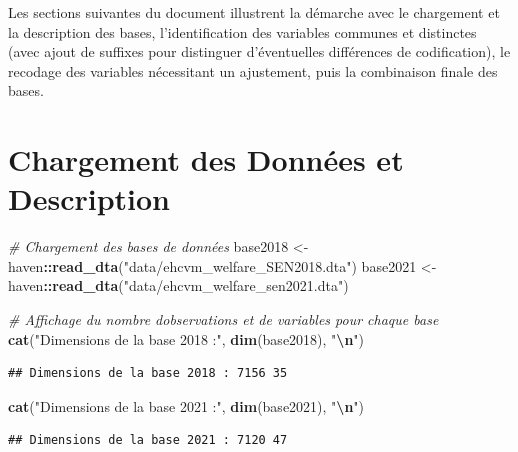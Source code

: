 \documentclass[
]{article}
\newenvironment{Shaded}{\begin{snugshade}}{\end{snugshade}}
\newcommand{\CommentTok}[1]{\textcolor[rgb]{0.56,0.35,0.01}{\textit{#1}}}
\newcommand{\FunctionTok}[1]{\textcolor[rgb]{0.13,0.29,0.53}{\textbf{#1}}}
\newcommand{\NormalTok}[1]{#1}
\newcommand{\OtherTok}[1]{\textcolor[rgb]{0.56,0.35,0.01}{#1}}
\newcommand{\SpecialCharTok}[1]{\textcolor[rgb]{0.81,0.36,0.00}{\textbf{#1}}}
\newcommand{\StringTok}[1]{\textcolor[rgb]{0.31,0.60,0.02}{#1}}
\begin{document}
Les sections suivantes du document illustrent la démarche avec le
chargement et la description des bases, l'identification des variables
communes et distinctes (avec ajout de suffixes pour distinguer
d'éventuelles différences de codification), le recodage des variables
nécessitant un ajustement, puis la combinaison finale des bases.

\hypertarget{chargement-des-donnuxe9es-et-description}{%
\section{Chargement des Données et
Description}\label{chargement-des-donnuxe9es-et-description}}

\begin{Shaded}
\begin{Highlighting}[]
\CommentTok{\# Chargement des bases de données}
\NormalTok{base2018 }\OtherTok{\textless{}{-}}\NormalTok{ haven}\SpecialCharTok{::}\FunctionTok{read\_dta}\NormalTok{(}\StringTok{"data/ehcvm\_welfare\_SEN2018.dta"}\NormalTok{)}
\NormalTok{base2021 }\OtherTok{\textless{}{-}}\NormalTok{ haven}\SpecialCharTok{::}\FunctionTok{read\_dta}\NormalTok{(}\StringTok{"data/ehcvm\_welfare\_sen2021.dta"}\NormalTok{)}

\CommentTok{\# Affichage du nombre d\textquotesingle{}observations et de variables pour chaque base}
\FunctionTok{cat}\NormalTok{(}\StringTok{"Dimensions de la base 2018 :"}\NormalTok{, }\FunctionTok{dim}\NormalTok{(base2018), }\StringTok{"}\SpecialCharTok{\textbackslash{}n}\StringTok{"}\NormalTok{)}
\end{Highlighting}
\end{Shaded}

\begin{verbatim}
## Dimensions de la base 2018 : 7156 35
\end{verbatim}

\begin{Shaded}
\begin{Highlighting}[]
\FunctionTok{cat}\NormalTok{(}\StringTok{"Dimensions de la base 2021 :"}\NormalTok{, }\FunctionTok{dim}\NormalTok{(base2021), }\StringTok{"}\SpecialCharTok{\textbackslash{}n}\StringTok{"}\NormalTok{)}
\end{Highlighting}
\end{Shaded}

\begin{verbatim}
## Dimensions de la base 2021 : 7120 47
\end{verbatim}
\end{document}

